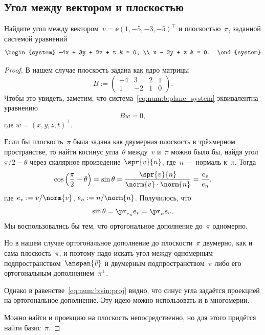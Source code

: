 \subsection{Угол между вектором и плоскостью}

Найдите угол между вектором~$v=\ee(1, -5, -3, -5)^\top$ и плоскостью~$\pi$, заданной системой уравнений
\begin{equation}
	\label{eq:num:b:plane_system}
	\begin{system}
		-4x + 3y + 2z + t 
		& = 0,
		\\
		x - 2y + z
		& = 0.
	\end{system}
\end{equation}

\begin{proof}
	В нашем случае плоскость задана как ядро матрицы
	\[
		B :=
		\begin{pmatrix}
			-4 & 3 & 2 & 1 \\
			1 & -2 & 1 & 0
		\end{pmatrix}
		.
	\]
	Чтобы это увидеть, заметим, что система~\eqref{eq:num:b:plane_system} эквивалентна уравнению
	\[
		Bw = 0
		,
	\]
	где $w = (x, y, z, t)^\top$.

	Если бы плоскость~$\pi$ была задана как двумерная плоскость в трёхмерном пространстве, то найти косинус угла~$\theta$ между~$v$ и~$\pi$ можно было бы, найдя угол~$\pi/2 - \theta$ через скалярное произедение~$\spr{v}{n}$, где~$n$ --- нормаль к~$\pi$. Тогда
	\[
		\cos
		\left( 
			\frac{\pi}{2} -
			\theta
		\right)
		=
		\sin{\theta}
		=
		\frac{\spr{v}{n}}{\norm{v} \cdot \norm{n}}
		=
		\frac{e_v}{e_n}
		,
	\]
	где~$e_v := v/\norm{v}$, $e_n := n/\norm{n}$. Получилось, что
	\begin{equation}
		\label{eq:num:b:sin:proj}
		\sin{\theta} = \pr_{e_n}{e_v} = \pr_n{e_v}
		,
	\end{equation}
	Мы воспользовались бы тем, что ортогональное дополнение до~$\pi$ одномерно.

	Но в нашем случае ортогональное дополнение до плоскости~$\pi$ двумерно, как и сама плоскость~$\pi$, и поэтому надо искать угол между одномерным подпространством~$\anspan{\vec{v}}$ и двумерным подпространством~$\pi$ либо его ортогональным дополнением~$\pi^{\bot}$.
	
	Однако в равенстве~\eqref{eq:num:b:sin:proj} видно, что синус угла задаётся проекцией на ортогональное дополнение. Эту идею можно использовать и в многомерии.

	Можно найти и проекцию на плоскость непосредственно, но для этого придётся найти базис~$\pi$.


\end{proof}

